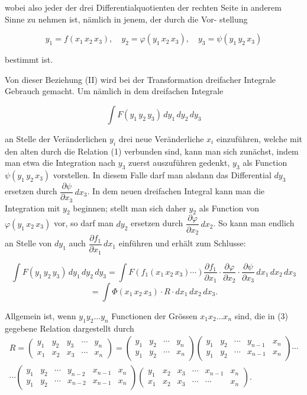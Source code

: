 wobei also jeder der drei Differentialquotienten der rechten Seite in
anderem Sinne zu nehmen ist, nämlich in jenem, der durch die Vor-
stellung

\[
y_1 = f(x_1\, x_2\, x_3), \quad y_2 = \varphi(y_1\, x_2\, x_3), \quad y_3 = \psi(y_1\, y_2\, x_3)
\]

bestimmt ist.

Von dieser Beziehung (II) wird bei der Transformation dreifacher
Integrale Gebrauch gemacht. Um nämlich in dem dreifachen Integrale

\[
\int F(y_1\, y_2\, y_3)\,dy_1\,dy_2\,dy_3
\]

an Stelle der Veränderlichen $y_i$ drei neue Veränderliche $x_i$ einzuführen,
welche mit den alten durch die Relation (1) verbunden sind, kann
man sich zunächst, indem man etwa die Integration nach $y_3$ zuerst
auszuführen gedenkt, $y_3$ als Function $\psi(y_1\, y_2\, x_3)$ vorstellen. In diesem
Falle darf man alsdann das Differential $dy_3$ ersetzen durch $\dfrac{\partial \psi}{\partial x_3}\,dx_3$.
In dem neuen dreifachen Integral kann man die Integration mit $y_2$
beginnen; stellt man sich daher $y_2$ als Function von $\varphi(y_1\, x_2\, x_3)$ vor,
so darf man $dy_2$ ersetzen durch $\dfrac{\partial \varphi}{\partial x_2}\,dx_2$. So kann man endlich an
Stelle von $dy_1$ auch $\dfrac{\partial f_1}{\partial x_1}\,dx_1$ einführen und erhält zum Schlusse:

\[
\int F(y_1\, y_2\, y_3)\,dy_1\,dy_2\,dy_3 = \int F(f_1(x_1\, x_2\, x_3)\cdots)\dfrac{\partial f_1}{\partial x_1}\cdot\dfrac{\partial \varphi}{\partial x_2}\cdot\dfrac{\partial \psi}{\partial x_3}\,dx_1\,dx_2\,dx_3
\]
\[
= \int \Phi(x_1\, x_2\, x_3)\cdot R \cdot dx_1\,dx_2\,dx_3.
\]



Allgemein ist, wenn $y_1 y_2 \ldots y_n$ Functionen der Grössen $x_1 x_2 \ldots x_n$ sind, die in (3) gegebene Relation dargestellt durch
\begin{gather*}
R = \begin{pmatrix} y_1 & y_2 & y_3 & \cdots & y_n \\ x_1 & x_2 & x_3 & \cdots & x_n \end{pmatrix}
= \begin{pmatrix} y_1 & y_2 & \cdots & y_n \\ y_1 & y_2 & \cdots & x_n \end{pmatrix}
\begin{pmatrix} y_1 & y_2 & \cdots & y_{n-1} & x_n \\ y_1 & y_2 & \cdots & x_{n-1} & x_n \end{pmatrix} \cdots \\
\cdots \begin{pmatrix} y_1 & y_2 & \cdots & y_{n-2} & x_{n-1} & x_n \\ y_1 & y_2 & \cdots & x_{n-2} & x_{n-1} & x_n \end{pmatrix}
\begin{pmatrix} y_1 & x_2 & x_3 & \cdots & x_{n-1} & x_n \\ x_1 & x_2 & x_3 & \cdots & \cdots & x_n \end{pmatrix}.
\end{gather*}

